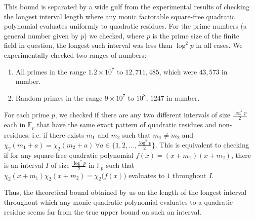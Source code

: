 \documentclass{report}
\begin{document}
%
%
This bound is separated by a wide gulf from the experimental results of checking the longest interval length where any monic factorable square-free quadratic polynomial evaluates uniformly to quadratic residues. For the prime numbers (a general number given by $p$) we checked, where $p$ is the prime size of the finite field in question, the longest such interval was less than $\log^2 p$ in all cases. We experimentally checked two ranges of numbers:
\begin{enumerate}
    \item All primes in the range $1.2\times10^7$ to $12,711,485$, which were $43,573$ in number.
    \item Random primes in the range $9\times10^7$ to $10^8$, $1247$ in number.
\end{enumerate}
For each prime $p$, we checked if there are any two different intervals of size $\frac{\log^2 p}{2}$ each in $\mathbb{F}_p$ that have the same exact pattern of quadratic residues and non-residues, i.e. if there exists $m_1$ and $m_2$ such that $m_1 \neq m_2$ and $\chi_2(m_1+a)=\chi_2(m_2+a)\ \forall a \in \{1,2,\ldots, \frac{\log^2 p}{2}\}$. This is equivalent to checking if for any square-free quadratic polynomial $f(x)=(x+m_1)(x+m_2)$, there is an interval $I$ of size $\frac{\log^2 p}{2}$ in $\mathbb{F}_p$ such that $\chi_2(x+m_1)\chi_2(x+m_2)=\chi_2 \big(f(x)\big)$ evaluates to $1$ throughout $I$.

Thus, the theoretical bound obtained by us on the length of the longest interval throughout which any monic quadratic polynomial evaluates to a quadratic residue seems far from the true upper bound on such an interval.
\end{document}
